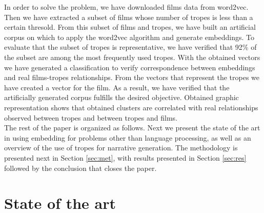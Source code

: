 \documentclass[letterpaper]{article}
\begin{document}
	   

    In order to solve the problem, we have downloaded films data from word2vec. Then we have extracted a subset of films whose number of tropes is less than a certain thresold. From this subset of films and tropes, we have built an artificial corpus on which to apply the word2vec algorithm and generate embeddings. To evaluate that the subset of tropes is representative, we have verified that 92\% of the subset are among the most frequently used tropes. With the obtained vectors we have generated a classification to verify correspondence between embeddings and real films-tropes relationships. From the vectors that represent the tropes we have created a vector for the film. As a result, we have verified that the artificially generated corpus fulfills the desired objective. Obtained graphic representation shows that obtained clusters are correlated with real relationships observed between tropes and between tropes and films.\\
 
	
	
	

	The rest of the paper is organized as follows. Next we present the
	state of the art in using embedding for problems other than language
	processing, as well as an overview of the use of tropes for narrative
	generation. The methodology is presented next in Section
	\ref{sec:met}, with results presented in Section \ref{sec:res}
	followed by the conclusion that closes the paper.
	
	
	\section{State of the art}
	
\end{document}
